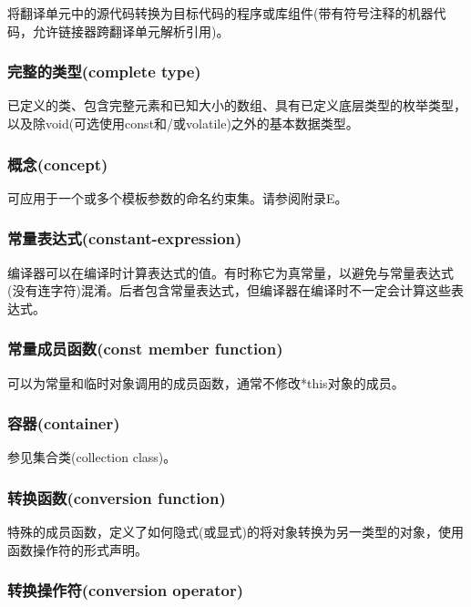 将翻译单元中的源代码转换为目标代码的程序或库组件(带有符号注释的机器代码，允许链接器跨翻译单元解析引用)。

\subsubsection{完整的类型(complete type)}

已定义的类、包含完整元素和已知大小的数组、具有已定义底层类型的枚举类型，以及除void(可选使用const和/或volatile)之外的基本数据类型。

\subsubsection{概念(concept)}

可应用于一个或多个模板参数的命名约束集。请参阅附录E。

\subsubsection{常量表达式(constant-expression)}

编译器可以在编译时计算表达式的值。有时称它为真常量，以避免与常量表达式(没有连字符)混淆。后者包含常量表达式，但编译器在编译时不一定会计算这些表达式。

\subsubsection{常量成员函数(const member function)}

可以为常量和临时对象调用的成员函数，通常不修改*this对象的成员。

\subsubsection{容器(container)}

参见集合类(collection class)。

\subsubsection{转换函数(conversion function)}

特殊的成员函数，定义了如何隐式(或显式)的将对象转换为另一类型的对象，使用函数操作符的形式声明。

\subsubsection{转换操作符(conversion operator)}

